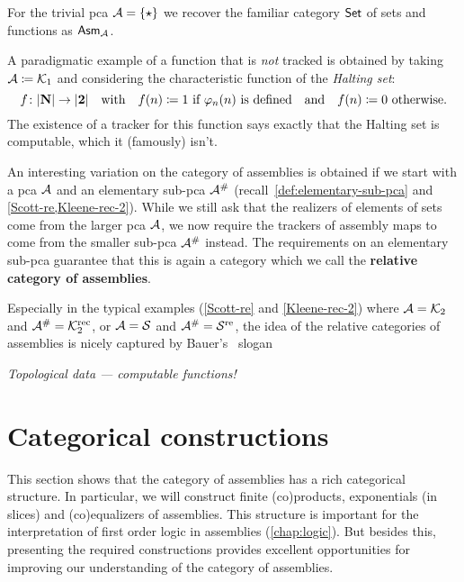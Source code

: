 \begin{example}
  For the trivial pca \(\AA = \set{\singleton}\) we recover the familiar
  category \(\Set\) of sets and functions as \(\Asm{\AA}\).
\end{example}

\begin{example}
  A paradigmatic example of a function that is \emph{not} tracked is obtained by
  taking \(\AA \coloneqq \Kone\) and considering the characteristic function of
  the \emph{Halting set}:
  \[
    f \colon \carrier{\NatAsm} \to \carrier{\Two}
    \quad\text{with}\quad
    f(n) \coloneqq 1 \text{ if \(\prenum{n}(n)\) is defined}
    \quad\text{and}\quad
    f(n) \coloneqq 0 \text{ otherwise}.
  \]
  The existence of a tracker for this function says exactly that the Halting set
  is computable, which it (famously) isn't.
\end{example}

\begin{remark}
  An interesting variation on the category of assemblies is obtained if we start
  with a pca \(\AA\) and an elementary sub-pca \(\AA^\#\)
  (recall~\cref{def:elementary-sub-pca} and \cref{Scott-re,Kleene-rec-2}).
  While we still ask that the realizers of elements of sets come from the
  larger pca \(\AA\), we now require the trackers of assembly maps to come from
  the smaller sub-pca \(\AA^\#\) instead.
  The requirements on an elementary sub-pca guarantee that this is again a
  category which we call the \textbf{relative category of assemblies}.

  Especially in the typical examples (\ref{Scott-re} and \ref{Kleene-rec-2})
  where \(\AA = \Ktwo\) and \(\AA^\# = \Ktworec\), or \(\AA = \Scott\) and
  \(\AA^\# = \Scottre\), the idea of the relative categories of assemblies is
  nicely captured by Bauer's~\cite[p.~36 and 45]{Bauer2000,Bauer2023}
  slogan
  \begin{center}
    \emph{Topological data --- computable functions!}
  \end{center}
\end{remark}

\section{Categorical constructions}

This section shows that the category of assemblies has a rich categorical
structure. In particular, we will construct finite (co)products, exponentials
(in slices) and (co)equalizers of assemblies.
%
This structure is important for the interpretation of first order logic in
assemblies (\cref{chap:logic}).%
%
But besides this, presenting the required constructions provides excellent
opportunities for improving our understanding of the category of assemblies.

